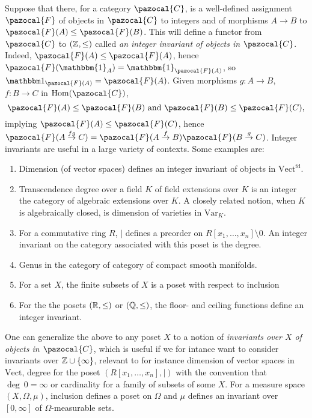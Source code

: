 \begin{example}\label{IntegerInvariants}
    Suppose that there, for a category $\pazocal{C}$, is a well-defined assignment $\pazocal{F}$ of objects in $\pazocal{C}$ to integers and of morphisms $A\rightarrow B$ to $\pazocal{F}(A)\leq \pazocal{F}(B)$. This will define a functor from $\pazocal{C}$ to $(\mathbb{Z},\leq)$ called \textit{an integer invariant of objects in $\pazocal{C}$}. Indeed, $\pazocal{F}(A) \leq \pazocal{F}(A)$, hence $\pazocal{F}(\mathbbm{1}_A)=\mathbbm{1}_{\pazocal{F}(A)}$, so $\fone_{\pazocal{F}(A)}= \pazocal{F}(A)$. Given morphisms $g:A\rightarrow B$, $f:B\rightarrow C$ in $\Hom(\pazocal{C})$, 
    $$\pazocal{F}(A)\leq\pazocal{F}(B) \text{ and } \pazocal{F}(B)\leq \pazocal{F}(C),$$
    implying $\pazocal{F}(A)\leq \pazocal{F}(C)$, hence $\pazocal{F}(A\overset{fg}{\rightarrow} C) = \pazocal{F}(A\overset{f}{\rightarrow}B)\pazocal{F}(B\overset{g}{\rightarrow}C)$.
    Integer invariants are useful in a large variety of contexts. Some examples are:
    \begin{enumerate}
        \item Dimension (of vector spaces) defines an integer invariant of objects in $\mathrm{Vect}^\mathrm{fd}$.
        \item Transcendence degree over a field $K$ of field extensions over $K$ is an integer the category of algebraic extensions over $K$. A closely related notion, when $K$ is algebraically closed, is dimension of varieties in $\mathrm{Var}_K$.
        \item For a commutative ring $R$, $\mid$ defines a preorder on $R[x_1,\dots,x_n]\setminus 0$. An integer invariant on the category associated with this poset is the degree. 
        \item Genus in the category of category of compact smooth manifolds.
        \item For a set $X$, the finite subsets of $X$ is a poset with respect to inclusion
        \item For the the posets $(\mathbb{R}, \leq)$ or $(\mathbb{Q},\leq)$, the floor- and ceiling functions define an integer invariant. 
    \end{enumerate}
    One can generalize the above to any poset $X$ to a notion of \emph{invariants over $X$ of objects in $\pazocal{C}$}, which is useful if we for intance want to consider invariants over $\mathbb{Z} \cup \{\infty\}$, relevant to for instance dimension of vector spaces in $\mathrm{Vect}$, degree for the poset $(R[x_1,\dots,x_n],\mid)$ with the convention that $\deg \ 0 = \infty$ or cardinality for a family of subsets of some $X$. For a measure space $(X,\Omega,\mu)$, inclusion defines a poset on $\Omega$ and $\mu$ defines an invariant over $[0,\infty]$ of $\Omega$-measurable sets. 
\end{example}
